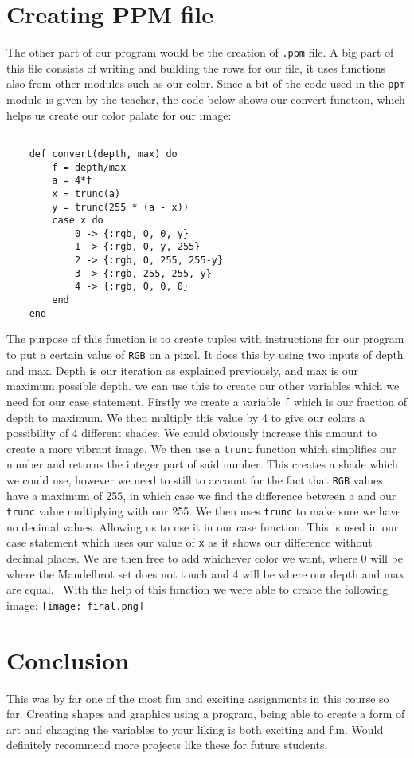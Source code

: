 \documentclass[a4paper,11pt]{article}
\begin{document}
\section*{Creating PPM file}

The other part of our program would be the creation of {\tt .ppm} file. A big part of this file consists of writing and building the rows for our file, it uses functions also from other modules such as our color. Since a bit of the code used in the {\tt ppm} module is given by the teacher, the code below shows our convert function, which helps us create our color palate for our image:

\begin{verbatim}

    def convert(depth, max) do
        f = depth/max
        a = 4*f
        x = trunc(a)
        y = trunc(255 * (a - x))
        case x do
            0 -> {:rgb, 0, 0, y}
            1 -> {:rgb, 0, y, 255}
            2 -> {:rgb, 0, 255, 255-y}
            3 -> {:rgb, 255, 255, y}
            4 -> {:rgb, 0, 0, 0}
        end
    end

\end{verbatim}

The purpose of this function is to create tuples with instructions for our program to put a certain value of {\tt RGB} on a pixel. It does this by using two inputs of depth and max. Depth is our iteration as explained previously, and max is our maximum possible depth. we can use this to create our other variables which we need for our case statement. Firstly we create a variable {\tt f} which is our fraction of depth to maximum. We then multiply this value by 4 to give our colors a possibility of 4 different shades. We could obviously increase this amount to create a more vibrant image. We then use a {\tt trunc} function which simplifies our number and returns the integer part of said number. This creates a shade which we could use, however we need to still to account for the fact that {\tt RGB} values have a maximum of 255, in which case we find the difference between a and our {\tt trunc} value multiplying with our 255. We then uses {\tt trunc} to make sure we have no decimal values. Allowing us to use it in our case function. This is used in our case statement which uses our value of {\tt x} as it shows our difference without decimal places. We are then free to add whichever color we want, where 0 will be where the Mandelbrot set does not touch and 4 will be where our depth and max are equal. 
\
With the help of this function we were able to create the following image:
\texttt{[image: final.png]}

\section*{Conclusion}

This was by far one of the most fun and exciting assignments in this course so far. Creating shapes and graphics using a program, being able to create a form of art and changing the variables to your liking is both exciting and fun. Would definitely recommend more projects like these for future students.
\end{document}
